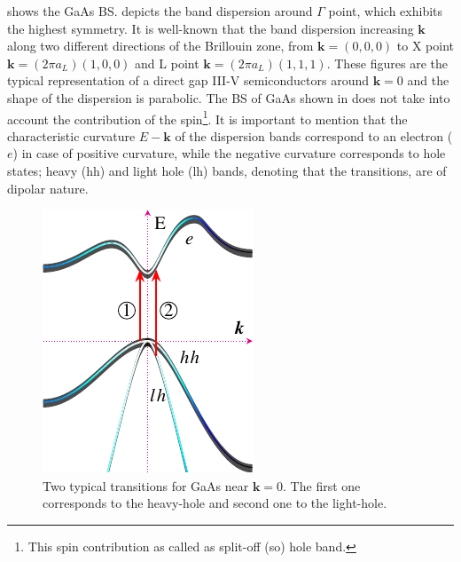  shows  the GaAs \gls{BS}.  depicts the band dispersion around $\Gamma$ point, which exhibits the highest symmetry.  It is well-known that the band dispersion increasing $\boldsymbol{k}$ along two different directions of the Brillouin zone, from $\boldsymbol{k}=(0,0,0)$ to X point $\boldsymbol{k}=(2\pi a_{L})(1,0,0)$ and L point $\boldsymbol{k}=(2\pi a_{L})(1,1,1)$. These figures are the typical representation of a direct gap III-V semiconductors around  $\boldsymbol{k}=0$ and the shape of the dispersion is parabolic. The BS of GaAs shown in  does not take into account the contribution of the spin\footnote{This spin contribution as called as split-off (so) hole band.}.  It is important to mention that the characteristic curvature $E\!\!-\!\!\boldsymbol{k}$ of the dispersion bands correspond to an electron ($e$) in case of positive curvature, while the negative curvature corresponds to hole states; heavy (hh) and light hole (lh) bands, denoting that the transitions, are of dipolar nature\cite{fox2002optical,cardona2005fundamentals}. 
\begin{figure}[h!]
	\centering
		\includegraphics[width=0.5\linewidth]{../figures/chapter-1/bands/build/bands02}
	\caption{
		Two typical transitions for GaAs near $\boldsymbol{k}=0$. The first one corresponds to the heavy-hole and second one to the light-hole.
		}
	\label{fig:subsubsection-1.1.1-GaAsbands-2}
\end{figure}


